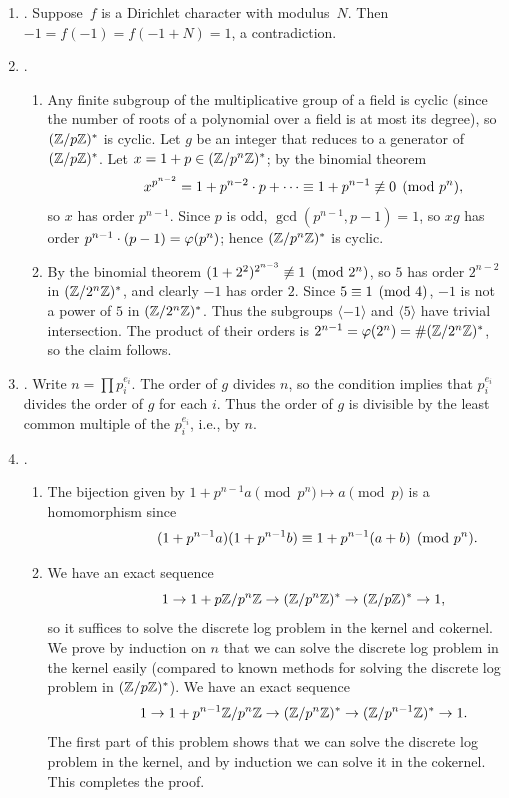 \begin{enumerate}
\item {}.
Suppose~$f$ is a Dirichlet character with modulus~$N$.
Then $-1=f(-1) = f(-1+N)=1$, a contradiction.

\item {}.
\begin{enumerate}
\item Any finite subgroup of the multiplicative group of a field
is cyclic (since the number of roots of a polynomial over a field
is at most its degree), so $(\mathbb{Z}/p\mathbb{Z})^*$ is cyclic.  Let $g$ be an
integer that reduces to a generator of $(\mathbb{Z}/p\mathbb{Z})^*$.
Let $x=1+p \in (\mathbb{Z}/p^n\mathbb{Z})^*$; by the binomial theorem 
$$\qquad\qquad x^{p^{n-2}} = 1 + p^{n-2} \cdot p + \cdots
         \equiv 1 + p^{n-1} \not\equiv 0 \pmod{p^{n}},
$$
so $x$ has order $p^{n-1}$. Since $p$ is odd, $\gcd(p^{n-1},p-1) = 1$,
so $xg$ has order $p^{n-1}\cdot (p-1) = \varphi(p^n)$; hence
$(\mathbb{Z}/p^n\mathbb{Z})^*$ is cyclic.  
\item By the binomial theorem $(1+2^2)^{2^{n-3}} \not\equiv 1 \pmod{2^n}$,
so $5$ has order $2^{n-2}$ in $(\mathbb{Z}/2^n\mathbb{Z})^*$, and clearly $-1$ has
order $2$. Since $5\equiv 1\pmod{4}$, $-1$ is not a power of $5$ in 
$(\mathbb{Z}/2^n\mathbb{Z})^*$.  Thus the subgroups $\langle -1 \rangle$
and $\langle 5 \rangle$ have trivial intersection.  
The product of their orders is $2^{n-1} = \varphi(2^n) = \#(\mathbb{Z}/2^n\mathbb{Z})^*$,
so the claim follows. 
\end{enumerate}

\item{}.
Write $n=\prod p_i^{e_i}$.
The order of $g$ divides $n$, so 
the condition implies that $p_i^{e_i}$ divides the order of $g$
for each $i$.   Thus the order of $g$ is divisible by the
least common multiple of the $p_i^{e_i}$, i.e., by $n$.


\item{}.
\begin{enumerate}
\item 
The bijection given by
$1+p^{n-1}a\pmod{p^n} \mapsto a\pmod{p}$
 is a homomorphism
since $$\hspace{6em}(1+p^{n-1}a)(1+p^{n-1}b) \equiv 1 + p^{n-1}(a+b) \pmod{p^n}.$$
\item We have an exact sequence
$$
 \qquad\qquad  1 \to 1 + p \mathbb{Z}/p^{n}\mathbb{Z} \to (\mathbb{Z}/p^n\mathbb{Z})^* \to (\mathbb{Z}/p\mathbb{Z})^*\to 1,
$$
so it suffices to solve the discrete log problem in the kernel
and cokernel. We prove by induction on $n$ that we can solve
the discrete log problem
in the kernel easily (compared to known methods for solving
the discrete log problem in $(\mathbb{Z}/p\mathbb{Z})^*$).
We have an exact sequence
$$
\qquad\qquad  1 \to 1 + p^{n-1} \mathbb{Z}/p^{n}\mathbb{Z} \to (\mathbb{Z}/p^n\mathbb{Z})^*  \to 
             (\mathbb{Z}/p^{n-1}\mathbb{Z})^* \to 1.$$
The
first part of this problem shows that we can solve the
discrete log problem in the kernel, and by induction
we can solve it in the cokernel.  This completes
the proof.
\end{enumerate}


\end{enumerate}
